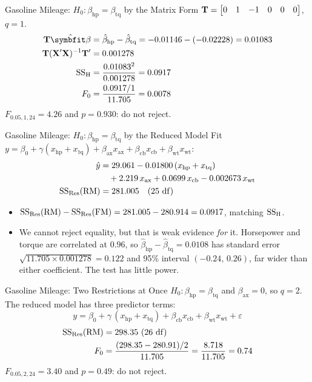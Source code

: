 \begin{frame}{Gasoline Mileage: $H_0:\beta_{\mathrm{hp}}=\beta_{\mathrm{tq}}$ by the Matrix Form}
    $\mathbf{T}=\begin{bmatrix}0&1&-1&0&0&0\end{bmatrix}$, $q=1$.
    \begin{align*}
        \bT\hat{\bbeta} &= \hat\beta_{\mathrm{hp}}-\hat\beta_{\mathrm{tq}} = -0.01146-(-0.02228) = 0.01083 \\
        \bT(\bX'\bX)^{-1}\bT' &= 0.001278 \\
        \SSH &= \frac{0.01083^2}{0.001278} = 0.0917 \\
        F_0 &= \frac{0.0917/1}{11.705} = 0.0078
    \end{align*}
    $F_{0.05,1,24}=4.26$ and $p=0.930$: do not reject.
\end{frame}


\begin{frame}{Gasoline Mileage: $H_0:\beta_{\mathrm{hp}}=\beta_{\mathrm{tq}}$ by the Reduced Model}
    Fit $y=\beta_0+\gamma(x_{\mathrm{hp}}+x_{\mathrm{tq}})+\beta_{\mathrm{ax}}x_{\mathrm{ax}}+\beta_{\mathrm{cb}}x_{\mathrm{cb}}+\beta_{\mathrm{wt}}x_{\mathrm{wt}}$:
    \begin{align*}
        \hat y &= 29.061 - 0.01800\,(x_{\mathrm{hp}}+x_{\mathrm{tq}}) \\
        &\quad + 2.219\,x_{\mathrm{ax}} + 0.0699\,x_{\mathrm{cb}} - 0.002673\,x_{\mathrm{wt}} \\
        \mathrm{SS}_{\mathrm{Res}}(\mathrm{RM}) &= 281.005 \quad(25\ \mathrm{df})
    \end{align*}
    \begin{itemize}
        \item $\mathrm{SS}_{\mathrm{Res}}(\mathrm{RM})-\mathrm{SS}_{\mathrm{Res}}(\mathrm{FM})=281.005-280.914=0.0917$, matching $\mathrm{SS}_{\mathrm{H}}$.
        \item We cannot reject equality, but that is weak evidence \emph{for} it. Horsepower and torque are correlated at $0.96$, so $\hat\beta_{\mathrm{hp}}-\hat\beta_{\mathrm{tq}}=0.0108$ has standard error $\sqrt{11.705\times0.001278}=0.122$ and 95\% interval $(-0.24,\,0.26)$, far wider than either coefficient. The test has little power.
    \end{itemize}
\end{frame}


\begin{frame}{Gasoline Mileage: Two Restrictions at Once}
    $H_0:\beta_{\mathrm{hp}}=\beta_{\mathrm{tq}}$ and $\beta_{\mathrm{ax}}=0$, so $q=2$. The reduced model has three predictor terms:
    \[
    y=\beta_0+\gamma\,(x_{\mathrm{hp}}+x_{\mathrm{tq}})+\beta_{\mathrm{cb}}x_{\mathrm{cb}}+\beta_{\mathrm{wt}}x_{\mathrm{wt}}+\varepsilon
    \]
    \begin{align*}
        \mathrm{SS}_{\mathrm{Res}}(\mathrm{RM}) &= 298.35\ (26\ \mathrm{df}) \\
        F_0 &= \frac{(298.35-280.91)/2}{11.705} = \frac{8.718}{11.705} = 0.74
    \end{align*}
    $F_{0.05,2,24}=3.40$ and $p=0.49$: do not reject.
\end{frame}


